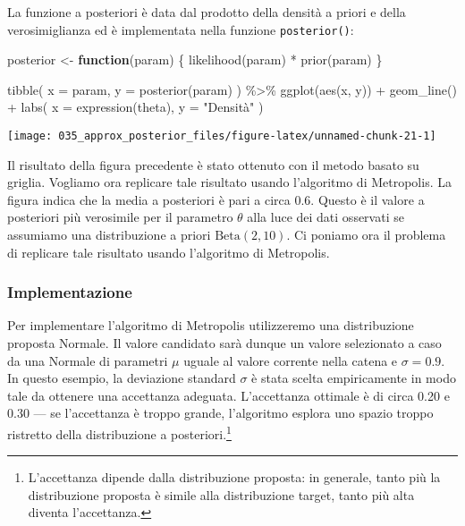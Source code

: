\documentclass[
]{memoir}
\newenvironment{Shaded}{\begin{snugshade}}{\end{snugshade}}
\newcommand{\AttributeTok}[1]{\textcolor[rgb]{0.77,0.63,0.00}{#1}}
\newcommand{\ControlFlowTok}[1]{\textcolor[rgb]{0.13,0.29,0.53}{\textbf{#1}}}
\newcommand{\FunctionTok}[1]{\textcolor[rgb]{0.00,0.00,0.00}{#1}}
\newcommand{\NormalTok}[1]{#1}
\newcommand{\OtherTok}[1]{\textcolor[rgb]{0.56,0.35,0.01}{#1}}
\newcommand{\SpecialCharTok}[1]{\textcolor[rgb]{0.00,0.00,0.00}{#1}}
\newcommand{\StringTok}[1]{\textcolor[rgb]{0.31,0.60,0.02}{#1}}
\begin{document}
La funzione a posteriori è data dal prodotto della densità a priori e della verosimiglianza ed è implementata nella funzione \texttt{posterior()}:

\begin{Shaded}
\begin{Highlighting}[]
\NormalTok{posterior }\OtherTok{\textless{}{-}} \ControlFlowTok{function}\NormalTok{(param) \{}
  \FunctionTok{likelihood}\NormalTok{(param) }\SpecialCharTok{*} \FunctionTok{prior}\NormalTok{(param)}
\NormalTok{\}}

\FunctionTok{tibble}\NormalTok{(}
  \AttributeTok{x =}\NormalTok{ param, }
  \AttributeTok{y =} \FunctionTok{posterior}\NormalTok{(param)}
\NormalTok{) }\SpecialCharTok{\%\textgreater{}\%}
  \FunctionTok{ggplot}\NormalTok{(}\FunctionTok{aes}\NormalTok{(x, y)) }\SpecialCharTok{+}
  \FunctionTok{geom\_line}\NormalTok{() }\SpecialCharTok{+}
  \FunctionTok{labs}\NormalTok{(}
    \AttributeTok{x =} \FunctionTok{expression}\NormalTok{(theta),}
    \AttributeTok{y =} \StringTok{"Densità"}
\NormalTok{  )}
\end{Highlighting}
\end{Shaded}

\begin{center}\texttt{[image: 035\_approx\_posterior\_files/figure-latex/unnamed-chunk-21-1]} \end{center}

Il risultato della figura precedente è stato ottenuto con il metodo basato su griglia. Vogliamo ora replicare tale risultato usando l'algoritmo di Metropolis. La figura indica che la media a posteriori è pari a circa 0.6. Questo è il valore a posteriori più verosimile per il parametro \(\theta\) alla luce dei dati osservati se assumiamo una distribuzione a priori \(\mbox{Beta}(2, 10)\). Ci poniamo ora il problema di replicare tale risultato usando l'algoritmo di Metropolis.

\hypertarget{implementazione}{%
\subsubsection{Implementazione}\label{implementazione}}

Per implementare l'algoritmo di Metropolis utilizzeremo una distribuzione proposta Normale. Il valore candidato sarà dunque un valore selezionato a caso da una Normale di parametri \(\mu\) uguale al valore corrente nella catena e \(\sigma = 0.9\). In questo esempio, la deviazione standard \(\sigma\) è stata scelta empiricamente in modo tale da ottenere una accettanza adeguata. L'accettanza ottimale è di circa 0.20 e 0.30 --- se l'accettanza è troppo grande, l'algoritmo esplora uno spazio troppo ristretto della distribuzione a posteriori.\footnote{L'accettanza dipende dalla distribuzione proposta: in generale, tanto più la distribuzione proposta è simile alla distribuzione target, tanto più alta diventa l'accettanza.}
\end{document}

